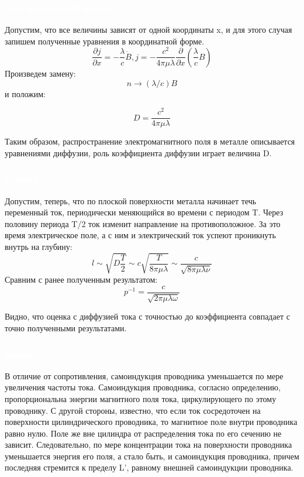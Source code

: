 \documentclass[aspectratio=169]{beamer}
\begin{document}
\begin{frame}
\frametitle{\textcolor{white}{Альтернативный вывод}}
Допустим, что все величины зависят от одной координаты x, и для этого случая запишем полученные уравнения в координатной форме.
\begin{equation*}
\frac{\partial j}{\partial x} = - \frac{\lambda}{c} \dot B, j = - \frac{c^2}{4 \pi \mu \lambda} \frac{\partial}{\partial x} \left( \frac{\lambda}{c} B \right)
\end{equation*}
Произведем замену: 
\begin{equation*}
n \rightarrow (\lambda/c)B
\end{equation*}
и положим: 

\begin{equation*}
D = \frac{c^2}{4 \pi \mu \lambda}
\end{equation*}

Таким образом, распространение электромагнитного поля в металле описывается уравнениями диффузии, роль коэффициента диффузии играет величина D.

\end{frame}

\begin{frame}
\frametitle{\textcolor{white}{Оценка}}
Допустим, теперь, что по плоской поверхности металла начинает течь переменный ток,  периодически меняющийся во времени с периодом T.
Через половину периода T/2 ток изменит направление на противоположное. За это время электрическое поле, а с ним и электрический ток успеют проникнуть внутрь на глубину:
\begin{equation*}
l \sim \sqrt{D \frac{T}{2}} \sim c \sqrt{\frac{T}{8 \pi \mu \lambda}} \sim \frac{c}{\sqrt{8 \pi \mu \lambda \nu}}
\end{equation*}
Сравним с ранее полученным результатом:
\begin{equation*}
p^{-1} =  \frac{c}{\sqrt{2 \pi \mu \lambda \omega}}
\end{equation*}

Видно, что оценка с диффузией тока с точностью до коэффициента совпадает с точно полученными результатами.
\end{frame}




\begin{frame}
\frametitle{\textcolor{white}{Вывод}}
В отличие от сопротивления, самоиндукция проводника уменьшается по мере увеличения частоты тока. Самоиндукция проводника, согласно определению, пропорциональна энергии магнитного поля тока, циркулирующего по этому проводнику. С другой стороны, известно, что если ток сосредоточен на поверхности цилиндрического проводника, то магнитное поле внутри проводника равно нулю. Поле же вне цилиндра от распределения тока по его сечению не зависит. Следовательно, по мере концентрации тока на поверхности проводника уменьшается энергия его поля, а стало быть, и самоиндукция проводника, причем последняя стремится к пределу L', равному внешней самоиндукции проводника.
\end{frame}
\end{document}
